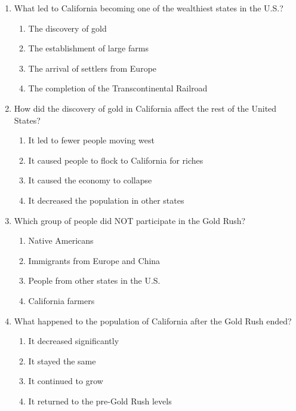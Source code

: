 \documentclass[12pt]{article}
\begin{document}
\begin{enumerate}
    \vspace{0.5cm}

    \item What led to California becoming one of the wealthiest states in the U.S.?
    \begin{enumerate}[label=\Alph*.]
        \item The discovery of gold
        \item The establishment of large farms
        \item The arrival of settlers from Europe
        \item The completion of the Transcontinental Railroad
    \end{enumerate}

    \vspace{0.5cm}

    \item How did the discovery of gold in California affect the rest of the United States?
    \begin{enumerate}[label=\Alph*.]
        \item It led to fewer people moving west
        \item It caused people to flock to California for riches
        \item It caused the economy to collapse
        \item It decreased the population in other states
    \end{enumerate}

    \vspace{0.5cm}

    \item Which group of people did NOT participate in the Gold Rush?
    \begin{enumerate}[label=\Alph*.]
        \item Native Americans
        \item Immigrants from Europe and China
        \item People from other states in the U.S.
        \item California farmers
    \end{enumerate}

    \vspace{0.5cm}

    \item What happened to the population of California after the Gold Rush ended?
    \begin{enumerate}[label=\Alph*.]
        \item It decreased significantly
        \item It stayed the same
        \item It continued to grow
        \item It returned to the pre-Gold Rush levels
    \end{enumerate}

\end{enumerate}
\end{document}
